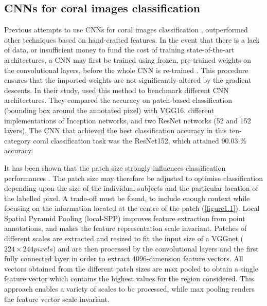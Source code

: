 \subsection{CNNs for coral images classification}\label{chapitre1_2.2}
Previous attempts to use CNNs for coral images classification \citep{beijbom_improving_2016, king_comparison_2018, mahmood_deep_2017, mahmood_coral_2016}, outperformed other techniques based on hand-crafted features. In the event that there is a lack of data, or insufficient money to fund the cost of training state-of-the-art architectures, a CNN may first be trained using frozen, pre-trained weights on the convolutional layers, before the whole CNN is re-trained \citep{king_comparison_2018}. This procedure ensures that the imported weights are not significantly altered by the gradient descents. In their study, \citet{king_comparison_2018} used this method to benchmark different CNN architectures. They compared the accuracy on patch-based classification (bounding box around the annotated pixel) with VGG16, different implementations of Inception networks, and two ResNet networks (52 and 152 layers). The CNN that achieved the best classification accuracy in this ten-category coral classification task was the ResNet152, which attained 90.03 \% accuracy.

It has been shown that the patch size strongly influences classification performances \citep{beijbom_automated_2012}. The patch size may therefore be adjusted to optimise classification depending upon the size of the individual subjects and the particular location of the labelled pixel. A trade-off must be found, to include enough context while focusing on the information located at the centre of the patch \citep{beijbom_automated_2012} (\autoref{figure1.1}). Local Spatial Pyramid Pooling (local-SPP) \citep{mahmood_coral_2016} improves feature extraction from point annotations, and makes the feature representation scale invariant. Patches of different scales are extracted and resized to fit the input size of a VGGnet (\(224 \times 244 pixels\)) and are then processed by the convolutional layers and the first fully connected layer in order to extract 4096-dimension feature vectors. All vectors obtained from the different patch sizes are max pooled to obtain a single feature vector which contains the highest values for the region considered. This approach enables a variety of scales to be processed, while max pooling renders the feature vector scale invariant.

